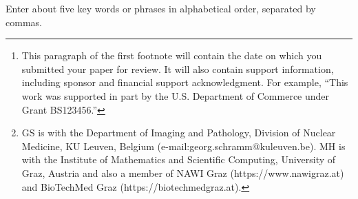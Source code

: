 \documentclass[journal,twoside,web]{ieeecolor}
\begin{document}
\title{}

\author{Georg Schramm and Martin Holler
\thanks{This paragraph of the first footnote will contain the date on which
you submitted your paper for review. It will also contain support information,
including sponsor and financial support acknowledgment. For example, 
``This work was supported in part by the U.S. Department of Commerce under Grant BS123456.'' }
\thanks{GS is with the Department of Imaging and Pathology, Division of Nuclear Medicine,
KU Leuven, Belgium (e-mail:georg.schramm@kuleuven.be).
MH is with the Institute of Mathematics and Scientific Computing, University of Graz, Austria and
also a member of NAWI Graz (https://www.nawigraz.at) and BioTechMed Graz (https://biotechmedgraz.at).}}

\maketitle

\begin{abstract}

\end{abstract}

\begin{IEEEkeywords}
Enter about five key words or phrases in alphabetical order, separated by commas.
\end{IEEEkeywords}



\printbibliography
\end{document}
